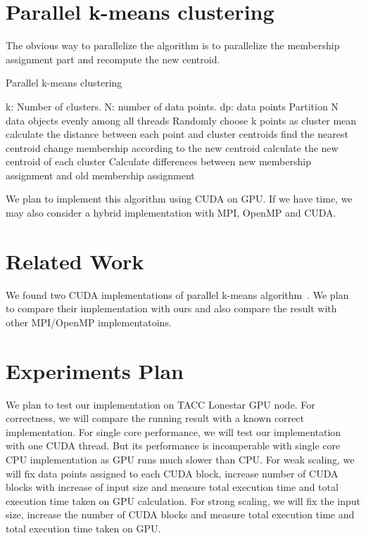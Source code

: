 \documentclass{article}
\begin{document}
\section{Parallel k-means clustering}
The obvious way to parallelize the algorithm is to parallelize the
membership assignment part and recompute the new centroid. 
\begin{algorithm}
  \caption{Parallel k-means clustering} \label{par}
  \begin{algorithmic}[1]
    \INPUT k: Number of clusters. N: number of data points. dp: data points
     \label{alg:p}
    \State Partition N data objects evenly among all threads
    \State Randomly choose k points as cluster mean
    \State calculate the distance between each point and
    cluster centroids
    \State find the nearest centroid
    \State change membership according to the new centroid
    \State calculate the new centroid of each cluster
    \EndParFor
    \State Calculate differences between new membership assignment and
    old membership assignment
    \EndWhile
    \EndFunction  
  \end{algorithmic}
\end{algorithm}

We plan to implement this algorithm using CUDA on GPU. If we have
time, we may also consider a hybrid implementation with MPI, OpenMP
and CUDA. 

\section{Related Work}
We found two CUDA implementations of parallel k-means
algorithm~\cite{serban-kmeans, gpuminer}. We plan to compare their
implementation with ours and also compare the result with other
MPI/OpenMP implementatoins.  

\section{Experiments Plan}
We plan to test our implementation on TACC Lonestar GPU node. For correctness,
we will compare the running result with a known correct
implementation. For single core performance, we will test our
implementation with one CUDA thread. But its performance is
incomperable with single core CPU implementation as GPU runs much
slower than CPU. For weak scaling, we will fix data points assigned to
each CUDA block, increase number of CUDA blocks with increase of
input size and measure total execution time and total execution time taken
on GPU calculation. For strong scaling, we will fix the input size,
increase the number of CUDA blocks and measure total execution
time and total execution time taken on GPU. 



\end{document}
